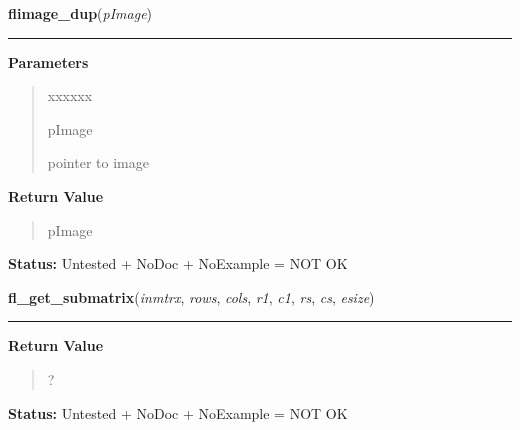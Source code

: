 \hspace{.8\funcindent}\begin{boxedminipage}{\funcwidth}

    \raggedright \textbf{flimage\_dup}(\textit{pImage})

    \vspace{-1.5ex}

    \rule{\textwidth}{0.5\fboxrule}
\setlength{\parskip}{2ex}
\setlength{\parskip}{1ex}
      \textbf{Parameters}
      \vspace{-1ex}

      \begin{quote}
        \begin{Ventry}{xxxxxx}

          \item[pImage]

          pointer to image

        \end{Ventry}

      \end{quote}

      \textbf{Return Value}
    \vspace{-1ex}

      \begin{quote}
      pImage

      \end{quote}

\textbf{Status:} Untested + NoDoc + NoExample = NOT OK



    \end{boxedminipage}

    \label{xformslib:library:fl_get_submatrix}

    \vspace{0.5ex}

\hspace{.8\funcindent}\begin{boxedminipage}{\funcwidth}

    \raggedright \textbf{fl\_get\_submatrix}(\textit{inmtrx}, \textit{rows}, \textit{cols}, \textit{r1}, \textit{c1}, \textit{rs}, \textit{cs}, \textit{esize})

    \vspace{-1.5ex}

    \rule{\textwidth}{0.5\fboxrule}
\setlength{\parskip}{2ex}
\setlength{\parskip}{1ex}
      \textbf{Return Value}
    \vspace{-1ex}

      \begin{quote}
      ?

      \end{quote}

\textbf{Status:} Untested + NoDoc + NoExample = NOT OK



    \end{boxedminipage}

